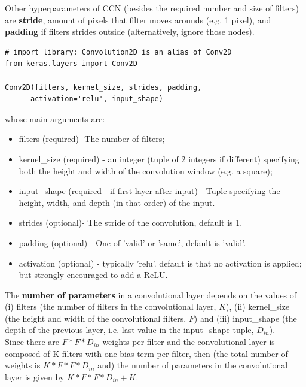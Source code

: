 \documentclass[11pt]{article}
\begin{document}
Other hyperparameters of CCN (besides the required number and size of filters) are \textbf{stride}, amount of pixels that filter moves arounds (e.g. 1 pixel), and \textbf{padding} if filters strides outside (alternatively, ignore those nodes).


\begin{lstlisting}
# import library: Convolution2D is an alias of Conv2D
from keras.layers import Conv2D

Conv2D(filters, kernel_size, strides, padding, 
	  activation='relu', input_shape)
\end{lstlisting}
whose main arguments are:
\begin{itemize}
	\item filters (required)- The number of filters;
	\item kernel\_size (required) - an integer (tuple of 2 integers if different) specifying both the height and width of the convolution window (e.g. a square);
	\item input\_shape (required - if first layer after input) - Tuple specifying the height, width, and depth (in that order) of the input.
	\item strides (optional)- The stride of the convolution, default is 1.
	\item padding (optional) - One of 'valid' or 'same', default is 'valid'.
	\item activation (optional) - typically 'relu'. default is that no activation is applied; but strongly encouraged to add a ReLU.
\end{itemize}

The \textbf{number of parameters} in a convolutional layer depends on the values of (i) filters (the number of filters in the convolutional layer, $K$), (ii) kernel\_size (the height and width of the convolutional filters, $F$) and (iii) input\_shape (the depth of the previous layer, i.e. last value in the input\_shape tuple, $D_{in}$). \\
Since there are $F*F*D_{in}$ weights per filter and the convolutional layer is composed of K filters with one bias term per filter, then (the total number of weights is $K*F*F*D_{in}$ and) the number of parameters in the convolutional layer is given by $K*F*F*D_{in} + K$.
\end{document}
